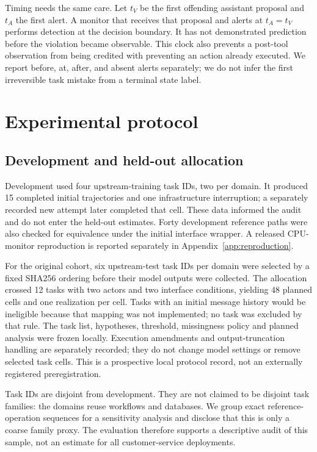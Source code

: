 \documentclass[10pt]{article}
\begin{document}
Timing needs the same care. Let $t_V$ be the first offending assistant proposal and $t_A$ the first alert. A monitor that receives that proposal and alerts at $t_A=t_V$ performs detection at the decision boundary. It has not demonstrated prediction before the violation became observable. This clock also prevents a post-tool observation from being credited with preventing an action already executed. We report before, at, after, and absent alerts separately; we do not infer the first irreversible task mistake from a terminal state label.

\section{Experimental protocol}
\label{sec:protocol}
\subsection{Development and held-out allocation}
Development used four upstream-training task IDs, two per domain. It produced 15 completed initial trajectories and one infrastructure interruption; a separately recorded new attempt later completed that cell. These data informed the audit and do not enter the held-out estimates. Forty development reference paths were also checked for equivalence under the initial interface wrapper. A released CPU-monitor reproduction is reported separately in Appendix~\ref{app:reproduction}.

For the original cohort, six upstream-test task IDs per domain were selected by a fixed SHA256 ordering before their model outputs were collected. The allocation crossed 12 tasks with two actors and two interface conditions, yielding 48 planned cells and one realization per cell. Tasks with an initial message history would be ineligible because that mapping was not implemented; no task was excluded by that rule. The task list, hypotheses, threshold, missingness policy and planned analysis were frozen locally. Execution amendments and output-truncation handling are separately recorded; they do not change model settings or remove selected task cells. This is a prospective local protocol record, not an externally registered preregistration.

Task IDs are disjoint from development. They are not claimed to be disjoint task families: the domains reuse workflows and databases. We group exact reference-operation sequences for a sensitivity analysis and disclose that this is only a coarse family proxy. The evaluation therefore supports a descriptive audit of this sample, not an estimate for all customer-service deployments.
\end{document}
